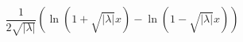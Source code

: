 \[\frac{1}{2\sqrt{|\lambda|}} \left(\ln (1+ \sqrt{|\lambda|}x) - \ln (1- \sqrt{|\lambda|}x) \right) \]